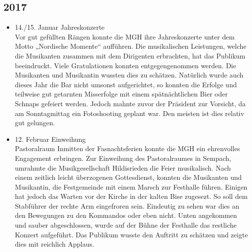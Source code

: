 \subsection*{2017}
\begin{history}

      \begin{itemize}

            \item 14./15. Januar Jahreskonzerte\\
                  Vor gut gefüllten Rängen konnte die MGH ihre Jahreskonzerte unter
                  dem Motto „Nordische Momente“ aufführen. Die musikalischen
                  Leistungen, welche die Musikanten zusammen mit dem Dirigenten
                  erbrachten, hat das Publikum beeindruckt. Viele Gratulationen
                  konnten entgegengenommen werden. Die Musikanten und Musikantin
                  wussten dies zu schätzen. Natürlich wurde auch dieses Jahr die Bar
                  nicht umsonst aufgerichtet, so konnten die Erfolge und teilweise
                  gut getarnten Misserfolge mit einem spätnächtlichen Bier oder
                  Schnaps gefeiert werden. Jedoch mahnte zuvor der Präsident zur
                  Vorsicht, da am Sonntagmittag ein Fotoshooting geplant war. Den
                  meisten ist dies relativ gut gelungen.

            \item 12. Februar Einweihung\\
                  Pastoralraum Inmitten der Fasnachtsferien konnte die MGH ein
                  ehrenvolles Engagement erbringen. Zur Einweihung des
                  Pastoralraumes in Sempach, umrahmte die Musikgesellschaft
                  Hildisrieden die Feier musikalisch. Nach einem zeitlich leicht
                  überzogenen Gottesdienst, konnten die Musikanten und Musikantin,
                  die Festgemeinde mit einem Marsch zur Festhalle führen. Einigen
                  hat jedoch das Warten vor der Kirche in der kalten Bise zugesezt.
                  So soll dem Stabführer der rechte Arm eingefroren sein. Eindeutig
                  zu sehen war dies an den Bewegungen zu den Kommandos oder eben
                  nicht. Unten angekommen und sauber abgeschlossen, wurde auf der
                  Bühne der Festhalle das restliche Konzert aufgeführt. Das Publikum
                  wusste den Auftritt zu schätzen und zeigte dies mit reichlich
                  Applaus.


\end{itemize}
\end{history}
